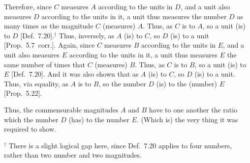 \begin{Parallel}{}{}
{Therefore, since $C$ measures $A$ according to the units in $D$, and
a unit also measures $D$ according to the units in it,  a unit thus measures the
number $D$ as many times as the magnitude $C$ (measures) $A$. 
Thus, as $C$ is to $A$, so a unit (is) to $D$ [Def.~7.20].$^\dag$ Thus, inversely, as $A$ (is) to $C$, so
$D$ (is) to a unit [Prop.~5.7~corr.]. Again, since
$C$ measures $B$ according to the units in $E$, and a unit also measures $E$ according to the units in it,   a unit thus measures $E$ the
same number of times that $C$ (measures) $B$. Thus, as $C$ is to $B$, so
a unit (is) to $E$ [Def.~7.20]. And it was also
shown that as $A$ (is) to $C$, so $D$ (is) to a unit. Thus, via equality,
as $A$ is to $B$, so the number $D$ (is) to the (number) $E$ [Prop.~5.22].

Thus, the commensurable magnitudes $A$ and $B$ have to one another
the ratio which the number $D$ (has) to the number $E$. (Which is) the
very thing it was required to show.}
\end{Parallel}
{\footnotesize\noindent$^\dag$ There is a slight logical gap here, since Def.~7.20  applies to four numbers, rather than two number and two magnitudes.}

